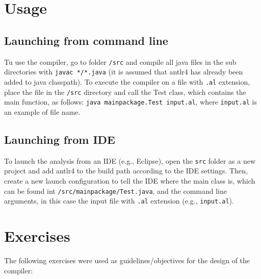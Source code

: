\documentclass[11pt]{article} %
\begin{document}
\section{Usage}

\subsection{Launching from command line}

Tu use the compiler, go to folder \verb|/src| and compile all java files in the sub directories with \verb|javac */*.java| (it is assumed that antlr4 has already been added to java classpath).
To execute the compiler on a file with \verb|.al| extension, place the file in the \verb|/src| directory and call the Test class, which contains the main function, as follows: \verb|java mainpackage.Test input.al|, where \verb|input.al| is an example of file name.

\subsection{Launching from IDE}
To launch the analysis from an IDE (e.g., Eclipse), open the \verb|src| folder as a new project and add antlr4 to the build path according to the IDE settings. Then, create a new launch configuration to tell the IDE where the main class is, which can be found int \verb|/src/mainpackage/Test.java|, and the command line arguments, in this case the input file with \verb|.al| extension (e.g., \verb|input.al|).

\section{Exercises}
\label{sec:exercices}
The following exercises were used as guidelines/objectives for the design of the compiler:
\end{document}
